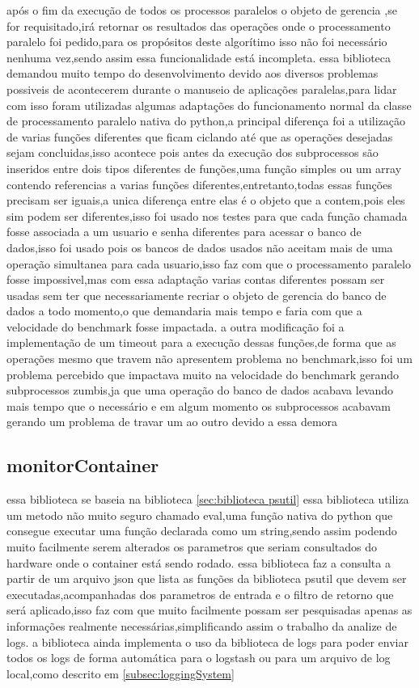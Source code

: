 \documentclass[
	12pt,				%
	openright,			%
	oneside,			%
	a4paper,			%
	english,			%
	french,				%
	spanish,			%
	brazil,				%
	]{abntex2}
\begin{document}
após o fim da execução de todos os processos paralelos o objeto de gerencia ,se for requisitado,irá retornar os resultados das operações onde o processamento paralelo foi pedido,para os propósitos deste algorítimo isso não foi necessário nenhuma vez,sendo assim essa funcionalidade está incompleta.
essa biblioteca demandou muito tempo do desenvolvimento devido aos diversos problemas possiveis de acontecerem durante o manuseio de aplicações paralelas,para lidar com isso foram utilizadas algumas adaptações do funcionamento normal da classe de processamento paralelo nativa do python,a principal diferença foi a utilização de varias funções diferentes que ficam ciclando até que as operações desejadas sejam concluidas,isso acontece pois antes da execução dos subprocessos são inseridos entre dois tipos diferentes de funções,uma função simples ou um array contendo referencias a varias funções diferentes,entretanto,todas essas funções precisam ser iguais,a unica diferença entre elas é o objeto que a contem,pois eles sim podem ser diferentes,isso foi usado nos testes para que cada função chamada fosse associada a um usuario e senha diferentes para acessar o banco de dados,isso foi usado pois os bancos de dados usados não aceitam mais de uma operação simultanea para cada usuario,isso faz com que o processamento paralelo fosse impossivel,mas com essa adaptação varias contas diferentes possam ser usadas sem ter que necessariamente recriar o objeto de gerencia do banco de dados a todo momento,o que demandaria mais tempo e faria com que a velocidade do benchmark fosse impactada.
a outra modificação foi a implementação de um timeout para a execução dessas funções,de forma que as operações mesmo que travem não apresentem problema no benchmark,isso foi um problema percebido que impactava muito na velocidade do benchmark gerando subprocessos zumbis,ja que uma operação do banco de dados acabava levando mais tempo que o necessário e em algum momento os subprocessos acabavam gerando um problema de travar um ao outro devido a essa demora

\subsection{monitorContainer}
\label{subsec:monitorContainer}
essa biblioteca se baseia na biblioteca \autoref{sec:biblioteca psutil} essa biblioteca utiliza um metodo não muito seguro chamado eval,uma função nativa do python que consegue executar uma função declarada como um string,sendo assim podendo muito facilmente serem alterados os parametros que seriam consultados do hardware onde o container está sendo rodado.
essa biblioteca faz a consulta a partir de um arquivo json que lista as funções da biblioteca psutil que devem ser executadas,acompanhadas dos parametros de entrada e o filtro de retorno que será aplicado,isso faz com que muito facilmente possam ser pesquisadas apenas as informações realmente necessárias,simplificando assim o trabalho da analize de logs.
a biblioteca ainda implementa o uso da biblioteca de logs para poder enviar todos os logs de forma automática para o logstash ou para um arquivo de log local,como descrito em \autoref{subsec:loggingSystem}
\end{document}
